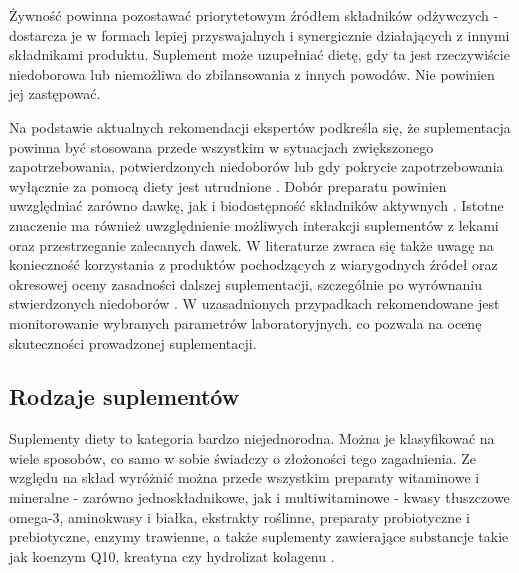 Żywność powinna pozostawać priorytetowym źródłem składników odżywczych - dostarcza je w formach lepiej przyswajalnych i synergicznie działających z innymi składnikami produktu. Suplement może uzupełniać dietę, gdy ta jest rzeczywiście niedoborowa lub niemożliwa do zbilansowania z innych powodów. Nie powinien jej zastępować.


Na podstawie aktualnych rekomendacji ekspertów podkreśla się, że suplementacja powinna być stosowana przede wszystkim w sytuacjach zwiększonego zapotrzebowania, potwierdzonych niedoborów lub gdy pokrycie zapotrzebowania wyłącznie za pomocą diety jest utrudnione \cite{jarosz2020normy,navarro2017liver}. Dobór preparatu powinien uwzględniać zarówno dawkę, jak i biodostępność składników aktywnych \cite{pludowski2023guidelines,tardy2020vitamins}. Istotne znaczenie ma również uwzględnienie możliwych interakcji suplementów z lekami oraz przestrzeganie zalecanych dawek. W literaturze zwraca się także uwagę na konieczność korzystania z produktów pochodzących z wiarygodnych źródeł oraz okresowej oceny zasadności dalszej suplementacji, szczególnie po wyrównaniu stwierdzonych niedoborów \cite{lin2023hidden}. W uzasadnionych przypadkach rekomendowane jest monitorowanie wybranych parametrów laboratoryjnych, co pozwala na ocenę skuteczności prowadzonej suplementacji.


\subsection{Rodzaje suplementów}

Suplementy diety to kategoria bardzo niejednorodna. Można je klasyfikować na wiele sposobów, co samo w sobie świadczy o złożoności tego zagadnienia. Ze względu na skład wyróżnić można przede wszystkim preparaty witaminowe i mineralne - zarówno jednoskładnikowe, jak i multiwitaminowe - kwasy tłuszczowe omega-3, aminokwasy i białka, ekstrakty roślinne, preparaty probiotyczne i prebiotyczne, enzymy trawienne, a także suplementy zawierające substancje takie jak koenzym Q10, kreatyna czy hydrolizat kolagenu \cite{dyrektywa2002,jarosz2020normy}.

